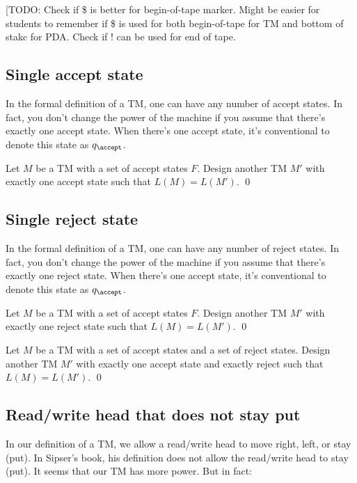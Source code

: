 [TODO: Check if \$ is better for begin-of-tape marker.
Might be easier for students to remember if \$ is used for
both begin-of-tape for TM and bottom of stakc for PDA.
Check if ! can be used for end of tape.

\newpage
\subsection{Single accept state}

In the formal definition of a TM, one can have any number of accept states.
In fact, you don't change the power of the machine if you assume that
there's exactly one accept state.
When there's one accept state, it's conventional to denote this
state as $q_\accept$.

\begin{ex}
Let $M$ be a TM with a set of accept states $F$.
Design another TM $M'$ with exactly one accept state such that
$L(M) = L(M')$.
\qed
\end{ex}

\newpage
\subsection{Single reject state}

In the formal definition of a TM, one can have any number of reject states.
In fact, you don't change the power of the machine if you assume that
there's exactly one reject state.
When there's one accept state, it's conventional to denote this
state as $q_\accept$.

\begin{ex}
Let $M$ be a TM with a set of accept states $F$.
Design another TM $M'$ with exactly one reject state such that
$L(M) = L(M')$.
\qed
\end{ex}

\begin{ex}
Let $M$ be a TM with a set of accept states and a set of reject states.
Design another TM $M'$ with
exactly one accept state and exactly reject
such that
$L(M) = L(M')$.
\qed
  \end{ex}


  
\newpage
\subsection{Read/write head that does not stay put}

In our definition of a TM, we allow a read/write head to move right, left,
or stay (put).
In Sipser's book, his definition does not allow the read/write head to
stay (put).
It seems that our TM has more power.
But in fact:

